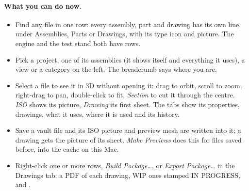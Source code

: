 \paragraph{What you can do now.}
\begin{itemize}[nosep]
  \item Find any file in one row: every assembly, part and drawing has its own line, under Assemblies, Parts or
        Drawings, with its type icon and picture. The engine and the test stand both have rows.
  \item Pick a project, one of its assemblies (it shows itself and everything it uses), a view or a category on
        the left. The breadcrumb says where you are.
  \item Select a file to see it in 3D without opening it: drag to orbit, scroll to zoom, right-drag to pan,
        double-click to fit, \emph{Section} to cut it through the centre. \emph{ISO} shows its picture,
        \emph{Drawing} its first sheet. The tabs show its properties, drawings, what it uses, where it is used and
        its history.
  \item Save a vault file and its ISO picture and preview mesh are written into it; a drawing gets the picture of
        its sheet. \emph{Make Previews} does this for files saved before, into the cache on this Mac.
  \item Right-click one or more rows, \emph{Build Package\ldots}, or \emph{Export Package\ldots} in the Drawings tab:
        a PDF of each drawing, WIP ones stamped IN PROGRESS, and .
\end{itemize}


